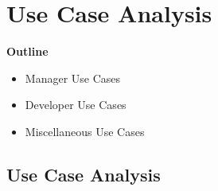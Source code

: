 % 

\section{Use Case Analysis}

\vspace{20mm}

\begin{abstract}
	\blindtext[3]
    
\end{abstract}


\vspace{20mm}

\large{\textbf{Outline}}

\begin{center}
    \begin{itemize}
        \item Manager Use Cases
        \item Developer Use Cases
        \item Miscellaneous Use Cases
    \end{itemize}
\end{center}

\pagebreak

\subsection{Use Case Analysis}


